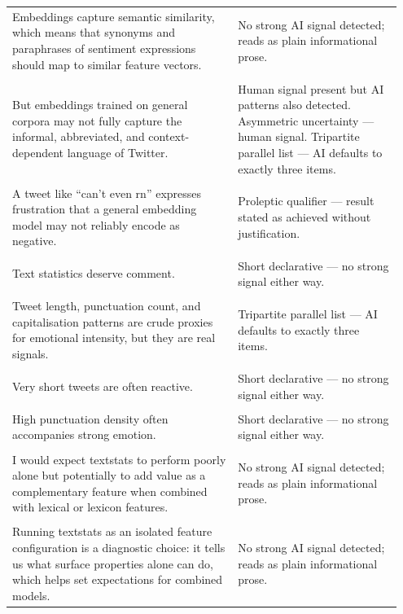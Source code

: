 \documentclass[11pt]{article}
\begin{document}
\begin{longtable}{|p{0.55\linewidth}|p{0.40\linewidth}|}
\hline
\rule{0pt}{3.5cm} & \\
\hline
Embeddings capture semantic similarity, which means that synonyms and paraphrases of sentiment expressions should map to similar feature vectors. & No strong AI signal detected; reads as plain informational prose. \\[2pt]
\hline
\rule{0pt}{3.5cm} & \\
\hline
But embeddings trained on general corpora may not fully capture the informal, abbreviated, and context-dependent language of Twitter. & Human signal present but AI patterns also detected. Asymmetric uncertainty --- human signal. Tripartite parallel list --- AI defaults to exactly three items. \\[2pt]
\hline
\rule{0pt}{3.5cm} & \\
\hline
A tweet like ``can't even rn'' expresses frustration that a general embedding model may not reliably encode as negative. & Proleptic qualifier --- result stated as achieved without justification. \\[2pt]
\hline
\rule{0pt}{3.5cm} & \\
\hline
Text statistics deserve comment. & Short declarative --- no strong signal either way. \\[2pt]
\hline
\rule{0pt}{3.5cm} & \\
\hline
Tweet length, punctuation count, and capitalisation patterns are crude proxies for emotional intensity, but they are real signals. & Tripartite parallel list --- AI defaults to exactly three items. \\[2pt]
\hline
\rule{0pt}{3.5cm} & \\
\hline
Very short tweets are often reactive. & Short declarative --- no strong signal either way. \\[2pt]
\hline
\rule{0pt}{3.5cm} & \\
\hline
High punctuation density often accompanies strong emotion. & Short declarative --- no strong signal either way. \\[2pt]
\hline
\rule{0pt}{3.5cm} & \\
\hline
I would expect textstats to perform poorly alone but potentially to add value as a complementary feature when combined with lexical or lexicon features. & No strong AI signal detected; reads as plain informational prose. \\[2pt]
\hline
\rule{0pt}{3.5cm} & \\
\hline
Running textstats as an isolated feature configuration is a diagnostic choice: it tells us what surface properties alone can do, which helps set expectations for combined models. & No strong AI signal detected; reads as plain informational prose. \\[2pt]

\end{longtable}
\end{document}
